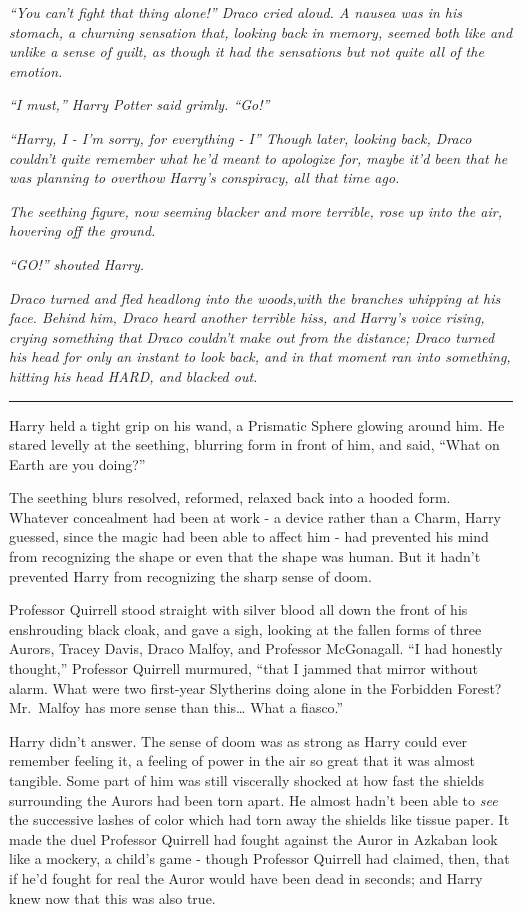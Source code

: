 \emph{``You can't fight that thing alone!'' Draco cried aloud. A nausea
was in his stomach, a churning sensation that, looking back in memory,
seemed both like and unlike a sense of guilt, as though it had the
sensations but not quite all of the emotion.}

\emph{``I must,'' Harry Potter said grimly. ``Go!''}

\emph{``Harry, I - I'm sorry, for everything - I'' Though later, looking
back, Draco couldn't quite remember what he'd meant to apologize for,
maybe it'd been that he was planning to overthow Harry's conspiracy, all
that time ago.}

\emph{The seething figure, now seeming blacker and more terrible, rose
up into the air, hovering off the ground.}

\emph{``GO!'' shouted Harry.}

\emph{Draco turned and fled headlong into the woods,with the branches
whipping at his face. Behind him, Draco heard another terrible hiss, and
Harry's voice rising, crying something that Draco couldn't make out from
the distance; Draco turned his head for only an instant to look back,
and in that moment ran into something, hitting his head HARD, and
blacked out.}

\begin{center}\rule{3in}{0.4pt}\end{center}

Harry held a tight grip on his wand, a Prismatic Sphere glowing around
him. He stared levelly at the seething, blurring form in front of him,
and said, ``What on Earth are you doing?''

The seething blurs resolved, reformed, relaxed back into a hooded form.
Whatever concealment had been at work - a device rather than a Charm,
Harry guessed, since the magic had been able to affect him - had
prevented his mind from recognizing the shape or even that the shape was
human. But it hadn't prevented Harry from recognizing the sharp sense of
doom.

Professor Quirrell stood straight with silver blood all down the front
of his enshrouding black cloak, and gave a sigh, looking at the fallen
forms of three Aurors, Tracey Davis, Draco Malfoy, and Professor
McGonagall. ``I had honestly thought,'' Professor Quirrell murmured,
``that I jammed that mirror without alarm. What were two first-year
Slytherins doing alone in the Forbidden Forest? Mr.~Malfoy has more
sense than this\ldots{} What a fiasco.''

Harry didn't answer. The sense of doom was as strong as Harry could ever
remember feeling it, a feeling of power in the air so great that it was
almost tangible. Some part of him was still viscerally shocked at how
fast the shields surrounding the Aurors had been torn apart. He almost
hadn't been able to \emph{see} the successive lashes of color which had
torn away the shields like tissue paper. It made the duel Professor
Quirrell had fought against the Auror in Azkaban look like a mockery, a
child's game - though Professor Quirrell had claimed, then, that if he'd
fought for real the Auror would have been dead in seconds; and Harry
knew now that this was also true.

